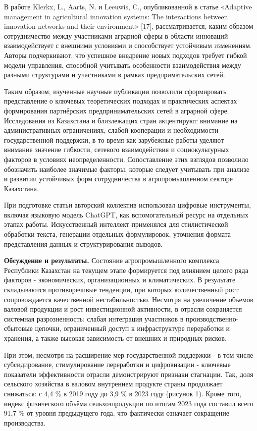 \begin{multicols}{2}
В работе Klerkx, L., Aarts, N. и Leeuwis, C., опубликованной в статье
«Adaptive management in agricultural innovation systems: The
interactions between innovation networks and their environment»
{[}17{]}, рассматривается, каким образом сотрудничество между
участниками аграрной сферы в области инноваций взаимодействует с
внешними условиями и способствует устойчивым изменениям. Авторы
подчеркивают, что успешное внедрение новых подходов требует гибкой
модели управления, способной учитывать особенности взаимодействия между
разными структурами и участниками в рамках предпримательских сетей.

Таким образом, изученные научные публикации позволили сформировать
представление о ключевых теоретических подходах и практических аспектах
формирования партнёрских предпринимательских сетей в аграрной сфере.
Исследования из Казахстана и близлежащих стран акцентируют внимание на
административных ограничениях, слабой кооперации и необходимости
государственной поддержки, в то время как зарубежные работы уделяют
внимание значение гибкости, сетевого взаимодействия и социокультурных
факторов в условиях неопределенности. Сопоставление этих взглядов
позволило обозначить наиболее значимые факторы, которые следует
учитывать при анализе и развитии устойчивых форм сотрудничества в
агропромышленном секторе Казахстана.

При подготовке статьи авторский коллектив использовал цифровые
инструменты, включая языковую модель ChatGPT, как вспомогательный ресурс
на отдельных этапах работы. Искусственный интеллект применялся для
стилистической обработки текста, генерации отдельных формулировок,
уточнения формата представления данных и структурирования выводов.

{\bfseries Обсуждение и результаты.} Состояние агропромышленного комплекса
Республики Казахстан на текущем этапе формируется под влиянием целого
ряда факторов - экономических, организационных и климатических. В
результате складываются противоречивые тенденции, при которых
количественный рост сопровождается качественной нестабильностью.
Несмотря на увеличение объемов валовой продукции и рост инвестиционной
активности, в отрасли сохраняется системная разрозненность: слабая
интеграция участников в производственно-сбытовые цепочки, ограниченный
доступ к инфраструктуре переработки и хранения, а также высокая
зависимость от внешних и природных рисков.

При этом, несмотря на расширение мер государственной поддержки - в том
числе субсидирование, стимулирование переработки и цифровизации -
ключевые показатели эффективности отрасли демонстрируют признаки
стагнации. Так, доля сельского хозяйства в валовом внутреннем продукте
страны продолжает снижаться: с 4,4 \% в 2019 году до 3,9 \% в 2023 году
(рисунок 1). Кроме того, индекс физического объёма сельхозпродукции по
итогам 2023 года составил всего 91,7 \% от уровня предыдущего года, что
фактически означает сокращение производства.
\end{multicols}

